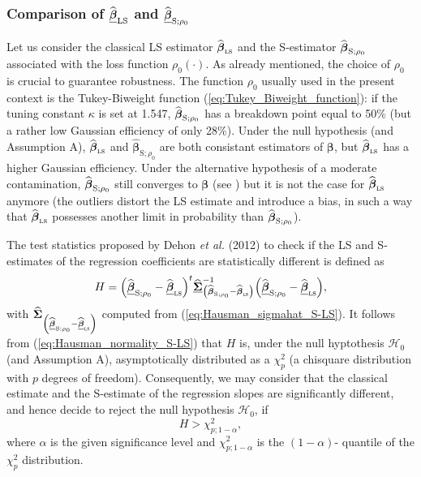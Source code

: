 \subsubsection{Comparison of $\widehat{\underline{\boldsymbol\beta}}_{\mathrm{LS}}$ and $\widehat{\underline{\boldsymbol\beta}}_{\mathrm{S};\rho_{0}}$}

Let us consider the classical LS estimator $\sthat{\boldsymbol\beta%
}_{\stsc{LS}}$ and the S-estimator $\sthat{\boldsymbol\beta}%
_{\mathrm{S};\rho_{0}}$ associated with the loss function $\rho_{0}\left(
\cdot\right)  $. As already mentioned, the choice of $\rho_{0}$ is crucial to
guarantee robustness. The function $\rho_{0}$ usually used in the present
context is the Tukey-Biweight function (\ref{eq:Tukey_Biweight_function}): if
the tuning constant $\kappa$ is set at 1.547, $\sthat{\boldsymbol\beta%
}_{\mathrm{S};\rho_{0}}$ has a breakdown point equal to 50\% (but a rather low
Gaussian efficiency of only 28\%). Under the null hypothesis (and Assumption
A), $\sthat{\boldsymbol\beta}_{\stsc{LS}}$ and $\widehat
{\boldsymbol\beta}_{\mathrm{S};\rho_{0}}$ are both consistant estimators of
$\boldsymbol\beta$, but $\sthat{\boldsymbol\beta}_{\stsc{LS}}$ has a
higher Gaussian efficiency. Under the alternative hypothesis of a moderate
contamination, $\widehat{\boldsymbol\beta}_{\mathrm{S};\rho_{0}}$ still
converges to $\boldsymbol\beta$ (see \citealp{Omelka:2010})
but it is not the case for $\sthat{\boldsymbol\beta}_{\stsc{LS}}$
anymore (the outliers distort the LS estimate and introduce a bias, in such a
way that $\sthat{\boldsymbol\beta}_{\stsc{LS}}$ possesses another limit
in probability than $\widehat{\boldsymbol\beta}_{\mathrm{S};\rho_{0}}$).

The test statistics proposed by Dehon \textit{et al.} (2012) to check if the
LS and S-estimates of the regression coefficients are statistically different
is defined as
\begin{equation}
H=\left(  \sthat{\underline{\boldsymbol\beta}}_{\mathrm{S};\rho_{0}%
}-\sthat{\underline{\boldsymbol\beta}}_{\stsc{LS}}\right)  ^{t}%
\sthat{\underline{\boldsymbol{\Sigma}}}_{\left(  \sthat{\boldsymbol{\beta
}}_{\mathrm{S};\rho_{0}}-\sthat{\boldsymbol\beta}_{\stsc{LS}}\right)
}^{-1}\left(  \sthat{\underline{\boldsymbol\beta}}_{\mathrm{S};\rho_{0}%
}-\sthat{\underline{\boldsymbol\beta}}_{\stsc{LS}}\right)  ,
\label{Hausman_SvsLS}%
\end{equation}
with $\sthat{\boldsymbol{\Sigma}}_{\left(  \sthat{\underline
{\boldsymbol\beta}}_{\mathrm{S};\rho_{0}}-\sthat{\underline
{\boldsymbol\beta}}_{\stsc{LS}}\right)  }$ computed from
(\ref{eq:Hausman_sigmahat_S-LS}). It follows from
(\ref{eq:Hausman_normality_S-LS}) that $H$ is, under the null hyptothesis
$\mathcal{H}_{0}$ (and Assumption A), asymptotically distributed as a
$\chi_{p}^{2}$ (a chisquare distribution with $p$ degrees of freedom).
Consequently, we may consider that the classical estimate and the S-estimate
of the regression slopes are significantly different, and hence decide to
reject the null hypothesis $\mathcal{H}_{0}$, if
\[
H>\chi_{p;1-\alpha}^{2},
\]
where $\alpha$ is the given significance level and $\chi_{p;1-\alpha}^{2}$ is
the $\left(  1-\alpha\right)  $- quantile of the $\chi_{p}^{2}$ distribution.

